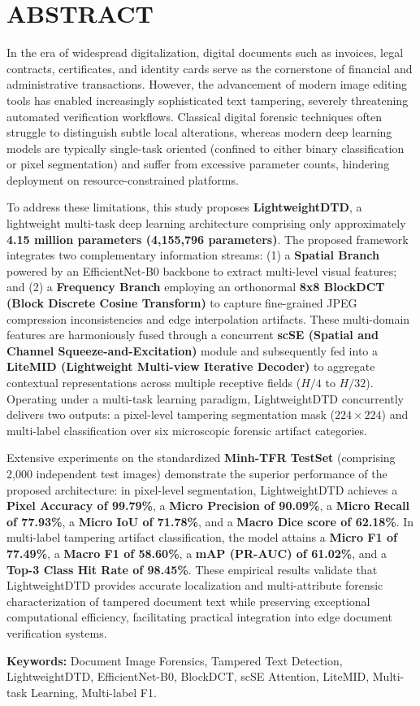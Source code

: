 \chapter{ABSTRACT}
\indent\indent In the era of widespread digitalization, digital documents such as invoices, legal contracts, certificates, and identity cards serve as the cornerstone of financial and administrative transactions. However, the advancement of modern image editing tools has enabled increasingly sophisticated text tampering, severely threatening automated verification workflows. Classical digital forensic techniques often struggle to distinguish subtle local alterations, whereas modern deep learning models are typically single-task oriented (confined to either binary classification or pixel segmentation) and suffer from excessive parameter counts, hindering deployment on resource-constrained platforms.

To address these limitations, this study proposes \textbf{LightweightDTD}, a lightweight multi-task deep learning architecture comprising only approximately \textbf{4.15 million parameters (4,155,796 parameters)}. The proposed framework integrates two complementary information streams: (1) a \textbf{Spatial Branch} powered by an EfficientNet-B0 backbone to extract multi-level visual features; and (2) a \textbf{Frequency Branch} employing an orthonormal \textbf{8x8 BlockDCT (Block Discrete Cosine Transform)} to capture fine-grained JPEG compression inconsistencies and edge interpolation artifacts. These multi-domain features are harmoniously fused through a concurrent \textbf{scSE (Spatial and Channel Squeeze-and-Excitation)} module and subsequently fed into a \textbf{LiteMID (Lightweight Multi-view Iterative Decoder)} to aggregate contextual representations across multiple receptive fields ($H/4$ to $H/32$). Operating under a multi-task learning paradigm, LightweightDTD concurrently delivers two outputs: a pixel-level tampering segmentation mask ($224 \times 224$) and multi-label classification over six microscopic forensic artifact categories.

Extensive experiments on the standardized \textbf{Minh-TFR TestSet} (comprising 2,000 independent test images) demonstrate the superior performance of the proposed architecture: in pixel-level segmentation, LightweightDTD achieves a \textbf{Pixel Accuracy of 99.79\%}, a \textbf{Micro Precision of 90.09\%}, a \textbf{Micro Recall of 77.93\%}, a \textbf{Micro IoU of 71.78\%}, and a \textbf{Macro Dice score of 62.18\%}. In multi-label tampering artifact classification, the model attains a \textbf{Micro F1 of 77.49\%}, a \textbf{Macro F1 of 58.60\%}, a \textbf{mAP (PR-AUC) of 61.02\%}, and a \textbf{Top-3 Class Hit Rate of 98.45\%}. These empirical results validate that LightweightDTD provides accurate localization and multi-attribute forensic characterization of tampered document text while preserving exceptional computational efficiency, facilitating practical integration into edge document verification systems.\vspace{0.3cm}

\textbf{Keywords:} Document Image Forensics, Tampered Text Detection, LightweightDTD, EfficientNet-B0, BlockDCT, scSE Attention, LiteMID, Multi-task Learning, Multi-label F1.
